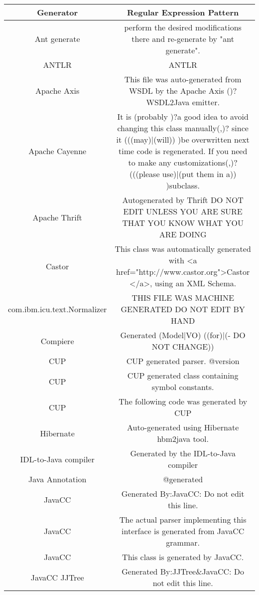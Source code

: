 \setlength{\extrarowheight}{0.2em}
\begin{table}
	\label{table:generatorPatternRepository_QC_00}
	\begin{tabularx}{\textwidth}{c|C}
		\textbf{Generator} & \textbf{Regular Expression Pattern} \\
		\hline
		Ant generate & perform the desired modifications there and re-generate by "ant generate". \\
		ANTLR & ANTLR \version \\
		Apache Axis & This file was auto-generated from WSDL by the Apache Axis (\version \timestamp )?WSDL2Java emitter. \\
		Apache Cayenne & It is (probably )?a good idea to avoid changing this class manually(,)? since it (((may)|(will)) )be overwritten next time code is regenerated. If you need to make any customizations(,)? (((please use)|(put them in a)) )subclass. \\
		Apache Thrift & Autogenerated by Thrift DO NOT EDIT UNLESS YOU ARE SURE THAT YOU KNOW WHAT YOU ARE DOING \\
		Castor & This class was automatically generated with <a href="http://www.castor.org">Castor \version</a>, using an XML Schema. \\
		com.ibm.icu.text.Normalizer & THIS FILE WAS MACHINE GENERATED DO NOT EDIT BY HAND \\
		Compiere &  Generated (Model|VO) ((for)|(- DO NOT CHANGE)) \\
		CUP & CUP \version generated parser. @version \timestamp \\
		CUP & CUP generated class containing symbol constants. \\
		CUP & The following code was generated by CUP \\
		Hibernate & Auto-generated using Hibernate hbm2java tool. \\
		IDL-to-Java compiler & Generated by the IDL-to-Java compiler \\
		Java Annotation & @generated \\
		JavaCC & Generated By:JavaCC: Do not edit this line. \\
		JavaCC & The actual parser implementing this interface is generated from JavaCC grammar. \\
		JavaCC & This class is generated by JavaCC. \\
		JavaCC JJTree & Generated By:JJTree\&JavaCC: Do not edit this line. \\
		
	\end{tabularx}
\end{table}
\setlength{\extrarowheight}{0em}